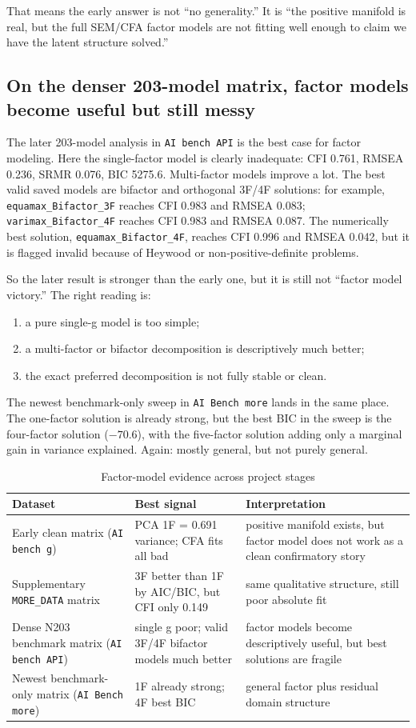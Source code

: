 \documentclass[11pt]{article}
\begin{document}
That means the early answer is not ``no generality.'' It is ``the positive manifold is real, but the full SEM/CFA factor models are not fitting well enough to claim we have the latent structure solved.''

\subsection{On the denser 203-model matrix, factor models become useful but still messy}
The later 203-model analysis in \texttt{AI bench API} is the best case for factor modeling. Here the single-factor model is clearly inadequate: CFI 0.761, RMSEA 0.236, SRMR 0.076, BIC 5275.6. Multi-factor models improve a lot. The best valid saved models are bifactor and orthogonal 3F/4F solutions: for example, \texttt{equamax\_Bifactor\_3F} reaches CFI 0.983 and RMSEA 0.083; \texttt{varimax\_Bifactor\_4F} reaches CFI 0.983 and RMSEA 0.087. The numerically best solution, \texttt{equamax\_Bifactor\_4F}, reaches CFI 0.996 and RMSEA 0.042, but it is flagged invalid because of Heywood or non-positive-definite problems.

So the later result is stronger than the early one, but it is still not ``factor model victory.'' The right reading is:
\begin{enumerate}
\item a pure single-g model is too simple;
\item a multi-factor or bifactor decomposition is descriptively much better;
\item the exact preferred decomposition is not fully stable or clean.
\end{enumerate}

The newest benchmark-only sweep in \texttt{AI Bench more} lands in the same place. The one-factor solution is already strong, but the best BIC in the sweep is the four-factor solution ($-70.6$), with the five-factor solution adding only a marginal gain in variance explained. Again: mostly general, but not purely general.

\begin{table}[H]
\centering
\caption{Factor-model evidence across project stages}
\begin{tabular}{p{1.7in}p{1.8in}p{2.9in}}
\toprule
Dataset & Best signal & Interpretation \\
\midrule
Early clean matrix (\texttt{AI bench g}) & PCA 1F = 0.691 variance; CFA fits all bad & positive manifold exists, but factor model does not work as a clean confirmatory story \\
Supplementary \texttt{MORE\_DATA} matrix & 3F better than 1F by AIC/BIC, but CFI only 0.149 & same qualitative structure, still poor absolute fit \\
Dense N203 benchmark matrix (\texttt{AI bench API}) & single g poor; valid 3F/4F bifactor models much better & factor models become descriptively useful, but best solutions are fragile \\
Newest benchmark-only matrix (\texttt{AI Bench more}) & 1F already strong; 4F best BIC & general factor plus residual domain structure \\
\bottomrule
\end{tabular}
\end{table}
\end{document}

